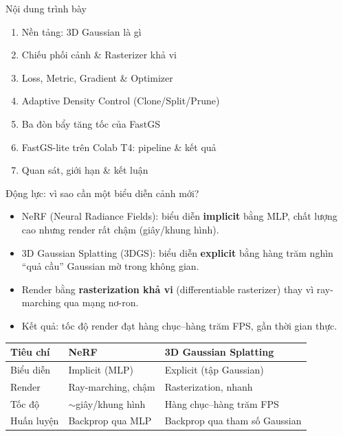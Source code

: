 \begin{frame}
\titlepage
\end{frame}

\begin{frame}{Nội dung trình bày}
\begin{enumerate}
    \item Nền tảng: 3D Gaussian là gì
    \item Chiếu phối cảnh \& Rasterizer khả vi
    \item Loss, Metric, Gradient \& Optimizer
    \item Adaptive Density Control (Clone/Split/Prune)
    \item Ba đòn bẩy tăng tốc của FastGS
    \item FastGS-lite trên Colab T4: pipeline \& kết quả
    \item Quan sát, giới hạn \& kết luận
\end{enumerate}
\end{frame}

\begin{frame}{Động lực: vì sao cần một biểu diễn cảnh mới?}
\begin{itemize}
    \item NeRF (Neural Radiance Fields): biểu diễn \textbf{implicit} bằng MLP, chất lượng cao nhưng render rất chậm (giây/khung hình).
    \item 3D Gaussian Splatting (3DGS): biểu diễn \textbf{explicit} bằng hàng trăm nghìn ``quả cầu'' Gaussian mờ trong không gian.
    \item Render bằng \textbf{rasterization khả vi} (differentiable rasterizer) thay vì ray-marching qua mạng nơ-ron.
    \item Kết quả: tốc độ render đạt hàng chục--hàng trăm FPS, gần thời gian thực.
\end{itemize}
\vspace{0.3cm}
\small
\centering
\begin{tabular}{lll}
\toprule
\textbf{Tiêu chí} & \textbf{NeRF} & \textbf{3D Gaussian Splatting} \\
\midrule
Biểu diễn & Implicit (MLP) & Explicit (tập Gaussian) \\
Render & Ray-marching, chậm & Rasterization, nhanh \\
Tốc độ & $\sim$giây/khung hình & Hàng chục--hàng trăm FPS \\
Huấn luyện & Backprop qua MLP & Backprop qua tham số Gaussian \\
\bottomrule
\end{tabular}
\end{frame}

